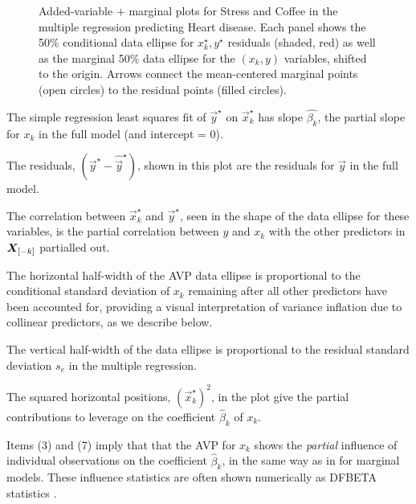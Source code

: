 \begin{figure}[htb]
\begin{minipage}[b]{.49\linewidth}
 \end{minipage}
  \caption{Added-variable $+$ marginal plots for Stress and Coffee in the multiple regression predicting Heart disease.
Each panel shows the 50\% conditional data ellipse for $x_k^\star, y^\star$ residuals (shaded, red) as well as the marginal 50\%
data ellipse for the $(x_k, y)$ variables, shifted to the origin.
Arrows connect the mean-centered marginal points (open circles) to the residual points (filled circles).}
  \label{fig:coffee-avplot-B}
\end{figure}

\begin{enumerate*}

 \item The simple regression least squares fit of $\vec{y}^\star$ on $\vec{x}_k^\star$ has slope $\hat{\beta_k}$,
 the partial slope for $x_k$ in the full model (and intercept = 0).

 \item The residuals, $(\vec{y}^\star - \widehat{\vec{y}}^\star)$, shown in this plot are the residuals for $\vec{y}$ in the full model.

 \item The correlation between $\vec{x}_k^\star$ and $\vec{y}^\star$, seen in the shape of the 
 data ellipse for these variables,
 is the partial correlation between $y$ and $x_k$ with the other predictors in $\bm{X}_{[-k]}$ partialled out.

 \item The horizontal half-width of the AVP data ellipse is proportional to the conditional standard deviation of
 $x_k$ remaining after all other predictors have been accounted for, providing a visual interpretation
 of variance inflation due to collinear predictors, as we describe below.

 \item The vertical half-width of the data ellipse is proportional to the residual standard deviation $s_e$ in the multiple regression.

 \item The squared horizontal positions, $(\vec{x}_k^\star)^2$, in the plot give the partial contributions
 to leverage on the coefficient $\hat{\beta}_k$ of $x_k$. 

 \item Items (3) and (7) imply that 
 that the AVP for $x_k$ shows the \emph{partial} influence of individual observations on the coefficient $\hat{\beta}_k$, 
 in the same way as in  for marginal models. These influence statistics are
 often shown numerically
 as DFBETA statistics \citep{Belsley-etal:80}.
 

\end{enumerate*}
